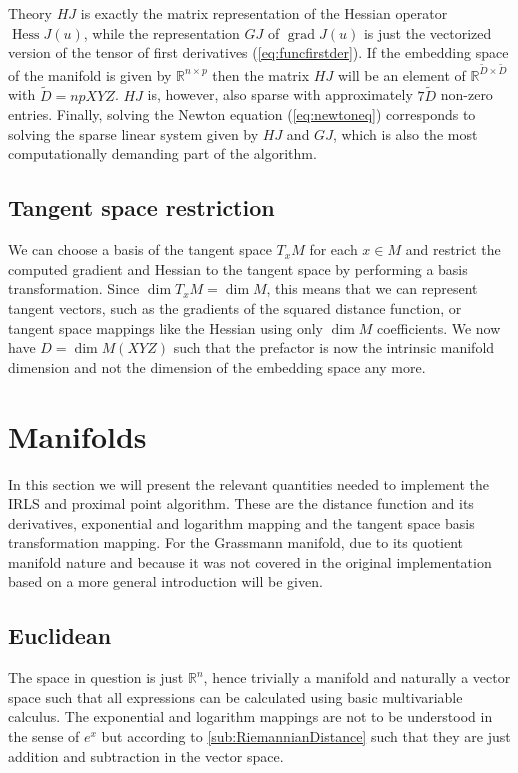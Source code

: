 \begin{chapter}{Theory}
$HJ$ is exactly the matrix representation of the Hessian operator $\operatorname{Hess}J(u)$, while the representation $GJ$ of $\operatorname{grad}J(u)$ is just the vectorized version
of the tensor of first derivatives (\ref{eq:funcfirstder}). If the embedding space of the manifold is given by $\mathbb{R}^{n\times p}$ then the matrix $HJ$
will be an element of $\mathbb{R}^{\tilde D\times\tilde D}$ with $\tilde D=npXYZ$. $HJ$ is, however, also sparse with approximately $7\tilde D$ non-zero entries.
Finally, solving the Newton equation (\ref{eq:newtoneq}) corresponds to solving the sparse linear system given by $HJ$ and $GJ$, which is also the most computationally demanding
part of the algorithm.

\subsection{Tangent space restriction} %
\label{sub:Tangent space restriction}
We can choose a basis of the tangent space $T_xM$ for each $x\in M$ and restrict the computed gradient and Hessian
to the tangent space by performing a basis transformation. Since $\operatorname{dim}T_xM=\operatorname{dim} M$, this means that we can represent tangent vectors, such as the gradients 
of the squared distance function, or tangent space mappings like the Hessian using only $\operatorname{dim} M$ coefficients. We now have $D=\operatorname{dim}M (XYZ)$ such that the 
prefactor is now the intrinsic manifold dimension and not the dimension of the embedding space any more.



\section{Manifolds} %
\label{sec:Manifolds}
In this section we will present the relevant quantities needed to implement the IRLS and proximal point algorithm. These are the distance function and its derivatives,
exponential and logarithm mapping and the tangent space basis transformation mapping. 
For the Grassmann manifold, due to its quotient manifold nature and because it was not covered in the original implementation based on \cite{SprecherIRLS}
a more general introduction will be given.

\subsection{Euclidean} %
\label{sub:Euclidian}
The space in question is just $\mathbb{R}^n$, hence trivially a manifold and naturally a vector space such that all expressions can be calculated using basic
multivariable calculus. The exponential and logarithm mappings are not to be understood in the sense of $e^x$ but according to \ref{sub:RiemannianDistance} such that
they are just addition and subtraction in the vector space.


\end{chapter}
